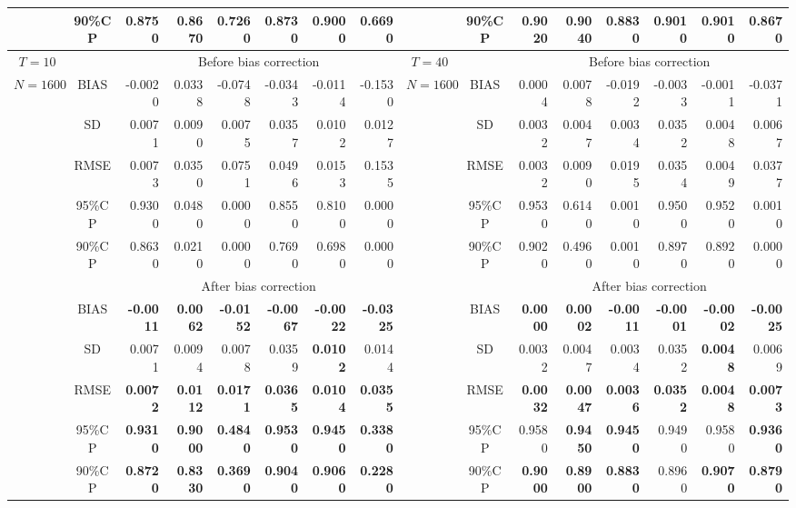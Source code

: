 \documentclass[11pt,a4paper]{article}
\begin{document}
\begin{landscape}
\begin{table}[p]
\begin{threeparttable}
{{\begin{tabular}{ccrrrrrrccrrrrrr}
 & 90\%CP & \textbf{0.8750} & \textbf{0.8670} & \textbf{0.7260} & \textbf{0.8730} & \textbf{0.9000} & \textbf{0.6690} &  & 90\%CP & \textbf{0.9020} & \textbf{0.9040} & \textbf{0.8830} & \textbf{0.9010} & \textbf{0.9010} & \textbf{0.8670} \\ \hline
$T=10$ &  & \multicolumn{6}{c}{Before bias correction} & $T=40$ &  & \multicolumn{6}{c}{Before bias correction} \\ \cline{3-8} \cline{11-16} 
$N=1600$ & BIAS & -0.0020 & 0.0338 & -0.0748 & -0.0343 & -0.0114 & -0.1530 & $N=1600$ & BIAS & 0.0004 & 0.0078 & -0.0192 & -0.0033 & -0.0011 & -0.0371 \\
 & SD & 0.0071 & 0.0090 & 0.0075 & 0.0357 & 0.0102 & 0.0127 &  & SD & 0.0032 & 0.0047 & 0.0034 & 0.0352 & 0.0048 & 0.0067 \\
 & RMSE & 0.0073 & 0.0350 & 0.0751 & 0.0496 & 0.0153 & 0.1535 &  & RMSE & 0.0032 & 0.0090 & 0.0195 & 0.0354 & 0.0049 & 0.0377 \\
 & 95\%CP & 0.9300 & 0.0480 & 0.0000 & 0.8550 & 0.8100 & 0.0000 &  & 95\%CP & 0.9530 & 0.6140 & 0.0010 & 0.9500 & 0.9520 & 0.0010 \\
 & 90\%CP & 0.8630 & 0.0210 & 0.0000 & 0.7690 & 0.6980 & 0.0000 &  & 90\%CP & 0.9020 & 0.4960 & 0.0010 & 0.8970 & 0.8920 & 0.0000 \\ \cline{2-8} \cline{10-16} 
 &  & \multicolumn{6}{c}{After bias correction} &  &  & \multicolumn{6}{c}{After bias correction} \\ \cline{3-8} \cline{11-16} 
 & BIAS & \textbf{-0.0011} & \textbf{0.0062} & \textbf{-0.0152} & \textbf{-0.0067} & \textbf{-0.0022} & \textbf{-0.0325} &  & BIAS & \textbf{0.0000} & \textbf{0.0002} & \textbf{-0.0011} & \textbf{-0.0001} & \textbf{-0.0002} & \textbf{-0.0025} \\
 & SD & 0.0071 & 0.0094 & 0.0078 & 0.0359 & \textbf{0.0102} & 0.0144 &  & SD & 0.0032 & 0.0047 & 0.0034 & 0.0352 & \textbf{0.0048} & 0.0069 \\
 & RMSE & \textbf{0.0072} & \textbf{0.0112} & \textbf{0.0171} & \textbf{0.0365} & \textbf{0.0104} & \textbf{0.0355} &  & RMSE & \textbf{0.0032} & \textbf{0.0047} & \textbf{0.0036} & \textbf{0.0352} & \textbf{0.0048} & \textbf{0.0073} \\
 & 95\%CP & \textbf{0.9310} & \textbf{0.9000} & \textbf{0.4840} & \textbf{0.9530} & \textbf{0.9450} & \textbf{0.3380} &  & 95\%CP & 0.9580 & \textbf{0.9450} & \textbf{0.9450} & 0.9490 & 0.9580 & \textbf{0.9360} \\
 & 90\%CP & \textbf{0.8720} & \textbf{0.8330} & \textbf{0.3690} & \textbf{0.9040} & \textbf{0.9060} & \textbf{0.2280} &  & 90\%CP & \textbf{0.9000} & \textbf{0.8900} & \textbf{0.8830} & 0.8960 & \textbf{0.9070} & \textbf{0.8790} \\ \hline

\end{tabular}}}
\end{threeparttable}
\end{table}
\end{landscape}
\end{document}
